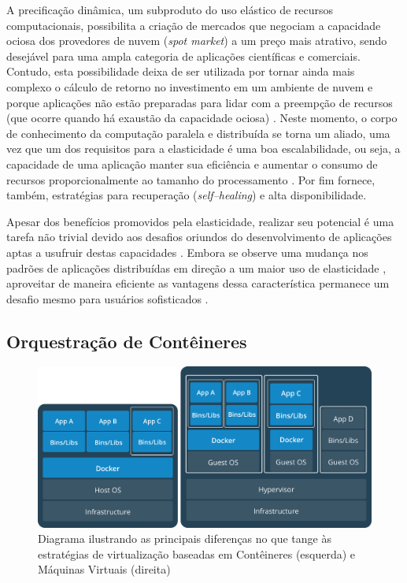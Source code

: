 \documentclass[english,brazilian]{UNISINOSmonografia} %
\newcommand\defaultFigureWidth{0.9}
\begin{document}
A precificação dinâmica, um subproduto do uso elástico de recursos computacionais, possibilita a criação de mercados que negociam a capacidade ociosa dos provedores de nuvem (\textit{spot market}) a um preço mais atrativo, sendo desejável para uma ampla categoria de aplicações científicas e comerciais.
Contudo, esta possibilidade deixa de ser utilizada por tornar ainda mais complexo o cálculo de retorno no investimento em um ambiente de nuvem e porque aplicações não estão preparadas para lidar com a preempção de recursos (que ocorre quando há exaustão da capacidade ociosa) \cite{Jonas2017}.
Neste momento, o corpo de conhecimento da computação paralela e distribuída se torna um aliado, uma vez que um dos requisitos para a elasticidade é uma boa escalabilidade, ou seja, a capacidade de uma aplicação manter sua eficiência e aumentar o consumo de recursos proporcionalmente ao tamanho do processamento \cite{Galante2012,HennessyPatterson2013}.
Por fim fornece, também, estratégias para recuperação (\textit{self--healing}) e alta disponibilidade.


Apesar dos benefícios promovidos pela elasticidade, realizar seu potencial é uma tarefa não trivial devido aos desafios oriundos do desenvolvimento de aplicações aptas a usufruir destas capacidades \cite{Raveendran2011,Loff2014}.
Embora se observe uma mudança nos padrões de aplicações distribuídas em direção a um maior uso de elasticidade \cite{Shankar2018}, aproveitar de maneira eficiente as vantagens dessa característica permanece um desafio mesmo para usuários sofisticados \cite{Jonas2017}.


\subsection{Orquestração de Contêineres}


\begin{figure}[tb]
	\centering%
	\begin{minipage}{\defaultFigureWidth\textwidth}
		\caption[Diagrama ilustrando as principais diferenças no que tange às estratégias de virtualização baseadas em Contêineres e Máquinas Virtuais]{Diagrama ilustrando as principais diferenças no que tange às estratégias de virtualização baseadas em Contêineres (esquerda) e Máquinas Virtuais (direita)}
		\label{fig:docker}
		\vspace{1ex}
		\includegraphics[clip,width=\textwidth]{docker-concept}
	\end{minipage}
\end{figure}
\end{document}

